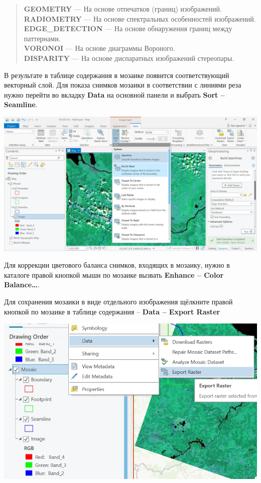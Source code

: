 \documentclass[
  12pt,
]{book}
\begin{document}
\begin{quote}
\textbf{GEOMETRY} --- На основе отпечатков (границ) изображений.\\
\textbf{RADIOMETRY} --- На основе спектральных особенностей изображений.\\
\textbf{EDGE\_DETECTION} --- На основе обнаружения границ между паттернами.\\
\textbf{VORONOI} --- На основе диаграммы Вороного.\\
\textbf{DISPARITY} --- На основе диспаратных изображений стереопары.
\end{quote}

В результате в таблице содержания в мозаике появится соответствующий векторный слой. Для показа снимков мозаики в соответствии с линиями реза нужно перейти во вкладку \textbf{Data} на основной панели и выбрать \textbf{Sort -- Seamline}.

\includegraphics{images/Ref03/Sort.png}

Для коррекции цветового баланса снимков, входящих в мозаику, нужно в каталоге правой кнопкой мыши по мозаике вызвать \textbf{Enhance -- Color Balance\ldots{}}.

Для сохранения мозаики в виде отдельного изображения щёлкните правой кнопкой по мозаике в таблице содержания -- \textbf{Data -- Export Raster}

\includegraphics{images/Ref03/Export_Mosaic.png}
\end{document}
